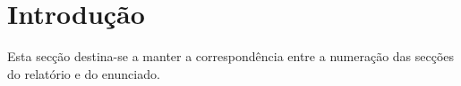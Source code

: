 
\section{Introdução}

Esta secção destina-se a manter a correspondência entre a numeração das secções do relatório e do enunciado.
